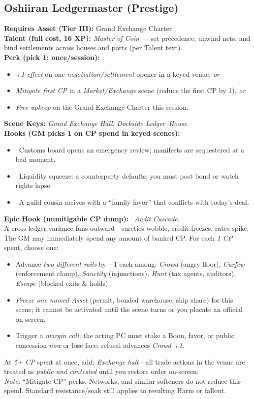 \documentclass[11pt]{article}
\begin{document}
\subsection*{Oshiiran Ledgermaster (Prestige)}
\textbf{Requires Asset (Tier III):} Grand Exchange Charter\\
\textbf{Talent (full cost, 16 XP):} \emph{Master of Coin} — set precedence, unwind nets, and bind settlements across houses and ports (per Talent text).\\
\textbf{Perk (pick 1; once/session):}
\begin{itemize}
  \item \emph{+1 effect} on one \emph{negotiation/settlement} opener in a keyed venue, \emph{or}
  \item \emph{Mitigate first CP} in a \emph{Market/Exchange} scene (reduce the first CP by 1), \emph{or}
  \item \emph{Free upkeep} on the Grand Exchange Charter this session.
\end{itemize}
\textbf{Scene Keys:} \emph{Grand Exchange Hall}, \emph{Dockside Ledger–House}.\\[2pt]
\textbf{Hooks (GM picks 1 on CP spend in keyed scenes):}
\begin{itemize}
  \item \clubsuit~Customs board opens an emergency review; manifests are sequestered at a bad moment.
  \item \diamondsuit~Liquidity squeeze: a counterparty defaults; you must post bond or watch rights lapse.
  \item \heartsuit~A guild cousin arrives with a “family favor” that conflicts with today’s deal.
\end{itemize}

\textbf{Epic Hook (unmitigable CP dump):} \spadesuit~\emph{Audit Cascade}.\\
A cross-ledger variance fans outward—sureties wobble, credit freezes, rates spike. The GM may immediately spend any amount of banked CP. For each \emph{1 CP} spent, choose one:
\begin{itemize}
  \item Advance \emph{two different rails} by +1 each among: \emph{Crowd} (angry floor), \emph{Curfew} (enforcement clamp), \emph{Sanctity} (injunctions), \emph{Hunt} (tax agents, auditors), \emph{Escape} (blocked exits \& holds).
  \item \emph{Freeze one named Asset} (permit, bonded warehouse, ship share) for this scene; it cannot be activated until the scene turns or you placate an official on-screen.
  \item Trigger a \emph{margin call}: the acting PC must stake a Boon, favor, or public concession \emph{now} or lose face; refusal advances \emph{Crowd +1}.
\end{itemize}
At \emph{5+ CP} spent at once, add: \emph{Exchange halt}—all trade actions in the venue are treated as \emph{public and contested} until you restore order on-screen.\\
\emph{Note:} “Mitigate CP” perks, Networks, and similar softeners do not reduce this spend. Standard resistance/soak still applies to resulting Harm or fallout.
\end{document}
